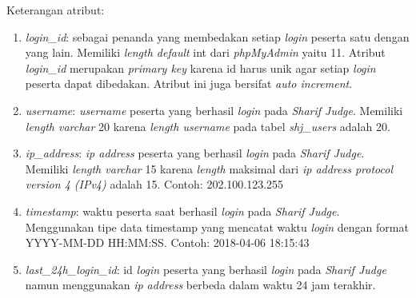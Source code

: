 Keterangan atribut:
\begin{enumerate}
	\item \textit{login\_id}: sebagai penanda yang membedakan setiap \textit{login} peserta satu dengan yang lain. Memiliki \textit{length default} int dari \textit{phpMyAdmin} yaitu 11. Atribut \textit{login\_id} merupakan \textit{primary key} karena id harus unik agar setiap \textit{login} peserta dapat dibedakan. Atribut ini juga bersifat \textit{auto increment}.
	\item \textit{username}: \textit{username} peserta yang berhasil \textit{login} pada \textit{Sharif Judge}. Memiliki \textit{length varchar} 20 karena \textit{length username} pada tabel \textit{shj\_users} adalah 20.
	\item \textit{ip\_address}: \textit{ip address} peserta yang berhasil \textit{login} pada \textit{Sharif Judge}. Memiliki \textit{length varchar} 15 karena \textit{length} maksimal dari \textit{ip address protocol version 4 (IPv4)} adalah 15. Contoh: 202.100.123.255
	\item \textit{timestamp}: waktu peserta saat berhasil \textit{login} pada \textit{Sharif Judge}. Menggunakan tipe data timestamp yang mencatat waktu \textit{login} dengan format YYYY-MM-DD HH:MM:SS. Contoh: 2018-04-06 18:15:43
	\item \textit{last\_24h\_login\_id}: id \textit{login} peserta yang berhasil \textit{login} pada \textit{Sharif Judge} namun menggunakan \textit{ip address} berbeda dalam waktu 24 jam terakhir.
\end{enumerate}

